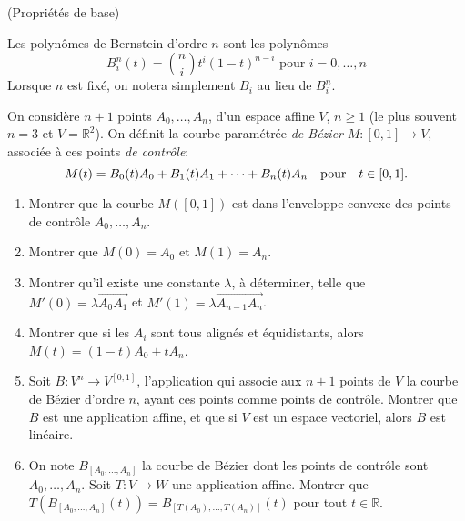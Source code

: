 \documentclass[a4paper,12pt,reqno]{amsart}
\begin{document}


\begin{exo}\label{exo:base} (Propriétés de base)

  Les polynômes de Bernstein d'ordre $n$ sont les polynômes
  $$
    B_{i}^{n}(t) =\binom{n}{i}t^{i}(1-t)^{n-i} \text{ pour } i=0,\ldots,n
  $$
  Lorsque $n$ est fixé, on notera simplement $B_{i}$ au lieu de $B_{i}^{n}$.

  On considère $n + 1$ points $A_{0},\ldots,A_{n}$, d'un espace affine $V$, $n \geq 1$ (le plus souvent $n = 3$ et $V=\mathbb{R}^{2}$).
  On définit la courbe paramétrée \emph{de Bézier} $M:[0,1] \rightarrow V$, associée à ces points \emph{de contrôle}:
  $$
    M(t) = B_{0}(t) A_{0} + B_{1}(t) A_{1} + \cdots + B_{n}(t) A_{n}
      \text{\quad pour\quad} t \in [0,1].
  $$
  \begin{enumerate}
    \item Montrer que la courbe $M([0,1])$ est dans l'enveloppe convexe des points de contrôle $A_{0},\ldots,A_{n}$.

    \item Montrer que $M(0)=A_{0}$ et $M(1)=A_{n}$.

    \item\label{exo:base:bords} Montrer qu'il existe une constante $\lambda$, à déterminer, telle que $M'(0)=\lambda\overrightarrow{A_{0}A_{1}}$ et $M'(1)=\lambda\overrightarrow{A_{n-1}A_{n}}$.

    \item\label{exo:base:allignes} Montrer que si les $A_{i}$ sont tous alignés et équidistants, alors $M(t) = (1-t) A_{0} + t A_{n}$.

    \item\label{exo:base:B} Soit $B:V^{n} \longrightarrow V^{[0,1]}$, l'application qui associe aux $n+1$ points de $V$ la courbe de Bézier d'ordre $n$, ayant ces points comme points de contrôle.
    Montrer que $B$ est une application affine, et que si $V$ est un espace vectoriel, alors $B$ est linéaire.

    \item On note $B_{[A_{0},\ldots,A_{n}]}$ la courbe de Bézier dont les points de contrôle sont $A_{0},\ldots,A_{n}$. Soit $T:V \rightarrow W$ une application affine. Montrer que $T(B_{[A_{0},\ldots,A_{n}]}(t)) = B_{[T(A_{0}),\ldots,T(A_{n})]}(t)$ pour tout $t \in \mathbb{R}$.
  \end{enumerate}
\end{exo}
\end{document}
